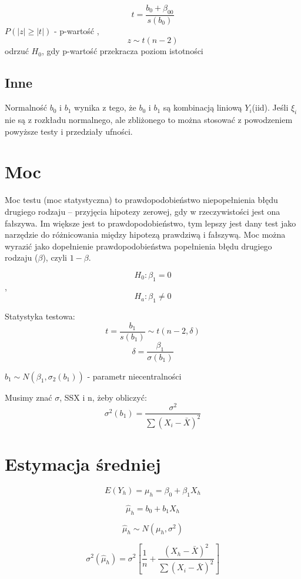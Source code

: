\documentclass[9pt]{article}  %
\begin{document}
      $$t = \frac{b_0+\beta_{00}}{s(b_0)}$$
    $P(|z| \ge |t|)$ - p-wartość , $$z \sim t(n-2)$$
    odrzuć $H_0$, gdy p-wartość przekracza poziom istotności
    
    
    \subsection{Inne}
    
    Normalność $b_0$ i $b_1$ wynika z tego, że $b_0$ i $b_1$ są kombinacją liniową $Y_i$(iid). Jeśli $\xi_i$ nie są z rozkładu normalnego, ale zbliżonego to można stosować z powodzeniem powyższe testy i przedziały ufności.
    
    
    
\section{Moc}

Moc testu (moc statystyczna) to prawdopodobieństwo niepopełnienia błędu drugiego rodzaju – przyjęcia hipotezy zerowej, gdy w rzeczywistości jest ona fałszywa. Im większe jest to prawdopodobieństwo, tym lepszy jest dany test jako narzędzie do różnicowania między hipotezą prawdziwą i fałszywą. Moc można wyrazić jako dopełnienie prawdopodobieństwa popełnienia błędu drugiego rodzaju ($\beta$), czyli $1-\beta$.

    $$H_0 : \beta_1 = 0$$, $$H_a : \beta_1 \ne 0$$
    
    Statystyka testowa:
    $$ t = \frac{ b_1 }{ s(b_1) } \sim t(n-2,\delta)$$
    $$\delta = \frac{\beta_1}{\sigma(b_1)}$$

    $b_1 \sim N(\beta_1, \sigma_2(b_1)) $ - parametr niecentralności

    Musimy znać $\sigma$, SSX i n, żeby obliczyć:
    $$\sigma^2(b_1) = \frac{\sigma^2}{\sum{\left(X_i - \bar{X}\right)^2 }}$$


  
\section{Estymacja średniej}

  $$E(Y_h) = \mu_h = \beta_0 + \beta_1 X_h  $$
  
  $$ \hat{\mu}_h = b_0 + b_1 X_h $$
  
  $$ \hat{\mu}_h \sim N(\mu_h, \sigma^2) $$
  
  $$\sigma^2 (\hat{\mu}_h) = \sigma^2 \left[  \frac{1}{n} + \frac{(X_h-\bar{X})^2 }{\sum{(X_i-\bar{X})^2} }   \right]$$
  
\end{document}
